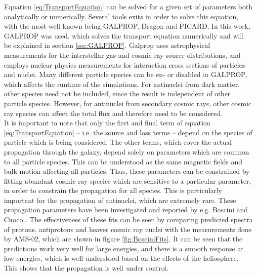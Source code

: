 Equation \ref{eq:TransportEquation} can be solved for a given set of parameters both analytically or numerically. Several tools exits in order to solve this equation, with the most well known being GALPROP\cite{}, Dragon \cite{} and PICARD\cite{}. In this work, GALPROP was used, which solves the transport equation numerically and will be explained in section \ref{sec:GALPROP}. Galprop uses astrophysical measurements for the interstellar gas and cosmic ray source distributions, and employs nuclear physics measurements for interaction cross sections of particles and nuclei. Many different particle species can be en- or disabled in GALPROP, which affects the runtime of the simulations. For antinuclei from dark matter, other species need not be included, since the result is independent of other particle species. However, for antinuclei from secondary cosmic rays, other cosmic ray species can affect the total flux and therefore need to be considered.\\

It is important to note that only the first and final term of equation \ref{eq:TransportEquation} -- i.e. the source and loss terms -- depend on the species of particle which is being considered. The other terms, which cover the actual propagation through the galaxy, depend solely on parameters which are common to all particle species. This can be understood as the same magnetic fields and bulk motion affecting all particles. Thus, these parameters can be constrained by fitting abundant cosmic ray species which are sensitive to a particular parameter, in order to constrain the propagation for all species. This is particularly important for the propagation of antinuclei, which are extremely rare. These propagation parameters have been investigated and reported by e.g. Boscini\cite{} and Cuoco \cite{}. The effectiveness of these fits can be seen by comparing predicted spectra of protons, antiprotons and heaver cosmic ray nuclei with the measurements done by AMS-02, which are shown in figure \ref{fig:BosciniFits}. It can be seen that the predictions work very well for large energies, and there is a smooth response at low energies, which is well understood based on the effects of the heliosphere. This shows that the propagation is well under control.\\

